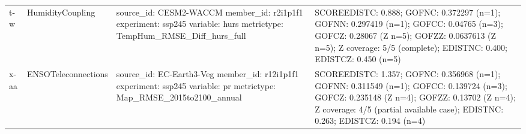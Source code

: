 \begin{table}[t]
\begin{tabularx}{\textwidth}{@{}l l X X@{}}
t-w & HumidityCoupling & source\_id: CESM2-WACCM \newline member\_id: r2i1p1f1 \newline experiment: ssp245 \newline variable: hurs \newline metrictype: TempHum\_RMSE\_Diff\_hurs\_full & SCOREEDISTC: 0.888; GOFNC: 0.372297 (n=1); GOFNN: 0.297419 (n=1); GOFCC: 0.04765 (n=3); GOFCZ: 0.28067 (Z n=5); GOFZZ: 0.0637613 (Z n=5); Z coverage: 5/5 (complete); EDISTNC: 0.400; EDISTCZ: 0.450 (n=5) \\
x-aa & ENSOTeleconnections & source\_id: EC-Earth3-Veg \newline member\_id: r12i1p1f1 \newline experiment: ssp245 \newline variable: pr \newline metrictype: Map\_RMSE\_2015to2100\_annual & SCOREEDISTC: 1.357; GOFNC: 0.356968 (n=1); GOFNN: 0.311549 (n=1); GOFCC: 0.139724 (n=3); GOFCZ: 0.235148 (Z n=4); GOFZZ: 0.13702 (Z n=4); Z coverage: 4/5 (partial available case); EDISTNC: 0.263; EDISTCZ: 0.194 (n=4) \\
\bottomrule
\end{tabularx}
\end{table}
